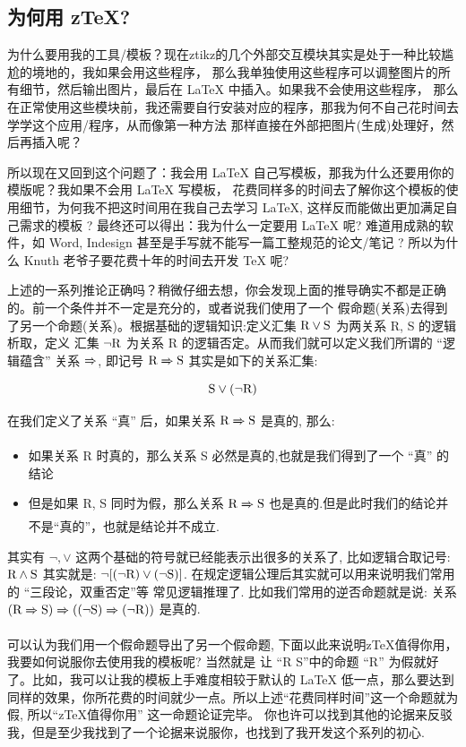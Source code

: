 \documentclass[
  hyper,    
  lang=cn,
  class=book,
  mathSpec={envStyle=leftbar, alias},
  toc={redef}
]{zlatex}
\begin{document}
\subsection{为何用 z\TeX{}?}
为什么要用我的工具/模板？现在ztikz的几个外部交互模块其实是处于一种比较尴尬的境地的，我如果会用这些程序，
那么我单独使用这些程序可以调整图片的所有细节，然后输出图片，最后在 \LaTeX{} 中插入。如果我不会使用这些程序，
那么在正常使用这些模块前，我还需要自行安装对应的程序，那我为何不自己花时间去学学这个应用/程序，从而像第一种方法
那样直接在外部把图片(生成)处理好，然后再插入呢？

所以现在又回到这个问题了：我会用 \LaTeX{} 自己写模板，那我为什么还要用你的模版呢？我如果不会用 \LaTeX{} 写模板，
花费同样多的时间去了解你这个模板的使用细节，为何我不把这时间用在我自己去学习 \LaTeX{}, 这样反而能做出更加满足自己需求的模板 ? 
最终还可以得出：我为什么一定要用 \LaTeX{} 呢? 难道用成熟的软件，如 Word, Indesign 甚至是手写就不能写一篇工整规范的论文/笔记 ? 
所以为什么 Knuth 老爷子要花费十年的时间去开发 \TeX{} 呢? 

上述的一系列推论正确吗？稍微仔细去想，你会发现上面的推导确实不都是正确的。前一个条件并不一定是充分的，或者说我们使用了一个
假命题(关系)去得到了另一个命题(关系)。根据基础的逻辑知识:定义汇集 $\text R \vee \text S$ 为两关系 R, S 的逻辑析取，定义
汇集 $\lnot \text R$ 为关系 R 的逻辑否定。从而我们就可以定义我们所谓的 ``逻辑蕴含'' 关系 $\xRightarrow[]{}$, 即记号 $\text R\xRightarrow[]{} \text S$ 
其实是如下的关系汇集:
\[
  \text S \vee (\lnot \text R)
\]

在我们定义了关系 ``真'' 后，如果关系 $\text R\xRightarrow[]{}\text S$ 是真的, 那么:
\begin{itemize}
  \item 如果关系 R 时真的，那么关系 S 必然是真的,也就是我们得到了一个 ``真'' 的结论
  \item 但是如果 R, S 同时为假，那么关系 $\text R\xRightarrow[]{}\text S$ 也是真的.但是此时我们的结论并不是``真的''，也就是结论并不成立.
\end{itemize}

\begin{remark}
其实有 $\lnot, \vee$ 这两个基础的符号就已经能表示出很多的关系了, 比如逻辑合取记号: $\text R\wedge \text S$ 其实就是:
$ \lnot [(\lnot \text R)\vee (\lnot \text S)]$. 在规定逻辑公理后其实就可以用来说明我们常用的 ``三段论，双重否定''等
常见逻辑推理了. 比如我们常用的逆否命题就是说: 关系 $(\text R\xRightarrow[]{}\text S) \xRightarrow[]{} ((\lnot\text S)\xRightarrow[]{}(\lnot\text R))$
是真的.
\end{remark}

可以认为我们用一个假命题导出了另一个假命题, 下面以此来说明z\TeX{}值得你用，我要如何说服你去使用我的模板呢? 当然就是
让 ``R\; \lrr{} S''中的命题 ``R'' 为假就好了。比如，我可以让我的模板上手难度相较于默认的 \LaTeX{} 低一点，那么要达到
同样的效果，你所花费的时间就少一点。所以上述``花费同样时间''这一个命题就为假, 所以``z\TeX{}值得你用'' 这一命题论证完毕。
你也许可以找到其他的论据来反驳我，但是至少我找到了一个论据来说服你，也找到了我开发这个系列的初心.
\end{document}
